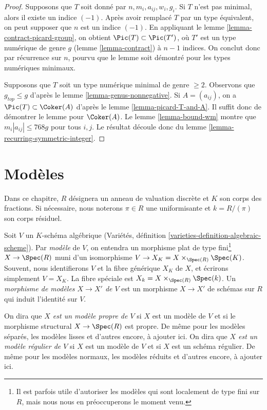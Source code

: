 \begin{proof}
Supposons que $T$ soit donné par $n, m_i, a_{ij}, w_i, g_i$.
Si $T$ n'est pas minimal, alors il existe un indice $(-1)$.
Après avoir remplacé $T$ par un type équivalent, on peut supposer que
$n$ est un indice $(-1)$. En appliquant le lemme \ref{lemma-contract-picard-group},
on obtient $\Pic(T) \subset \Pic(T')$, où $T'$
est un type numérique de genre $g$ (lemme \ref{lemma-contract})
à $n - 1$ indices. On conclut donc par récurrence sur $n$,
pourvu que le lemme soit démontré pour les types numériques minimaux.

\medskip\noindent
Supposons que $T$ soit un type numérique minimal de genre $\geq 2$.
Observons que $g_{top} \leq g$ d'après le lemme \ref{lemma-genus-nonnegative}.
Si $A = (a_{ij})$, on a $\Pic(T) \subset \Coker(A)$ d'après le
lemme \ref{lemma-picard-T-and-A}. Il suffit donc de démontrer le lemme
pour $\Coker(A)$.
Le lemme \ref{lemma-bound-wm} montre que $m_i|a_{ij}| \leq 768g$ pour
tous $i, j$.
Le résultat découle donc du lemme \ref{lemma-recurring-symmetric-integer}.
\end{proof}







\section{Modèles}
\label{section-models}

\noindent
Dans ce chapitre, $R$ désignera un anneau de valuation discrète et $K$ son
corps des fractions. Si nécessaire, nous noterons $\pi \in R$ une
uniformisante et $k = R/(\pi)$ son corps résiduel.

\medskip\noindent
Soit $V$ un $K$-schéma algébrique
(Variétés, définition \ref{varieties-definition-algebraic-scheme}).
Par {\it modèle} de $V$, on entendra un morphisme plat de type
fini\footnote{Il est parfois utile d'autoriser les modèles qui sont
localement de type fini sur $R$, mais nous nous en préoccuperons
le moment venu.}
$X \to \Spec(R)$ muni d'un
isomorphisme $V \to X_K = X \times_{\Spec(R)} \Spec(K)$. Souvent, nous
identifierons $V$ et la fibre générique $X_K$ de $X$, et
écrirons simplement $V = X_K$.
La fibre spéciale est $X_k = X \times_{\Spec(R)} \Spec(k)$.
Un {\it morphisme de modèles $X \to X'$ de $V$}
est un morphisme $X \to X'$ de schémas sur $R$ qui induit
l'identité sur $V$.

\medskip\noindent
On dira que {\it $X$ est un modèle propre de $V$} si $X$ est un modèle
de $V$ et si le morphisme structural $X \to \Spec(R)$ est propre.
De même pour les modèles séparés, les modèles lisses et d'autres encore,
à ajouter ici.
On dira que {\it $X$ est un modèle régulier de $V$} si $X$ est un modèle
de $V$ et si $X$ est un schéma régulier.
De même pour les modèles normaux, les modèles réduits et d'autres encore,
à ajouter ici.


